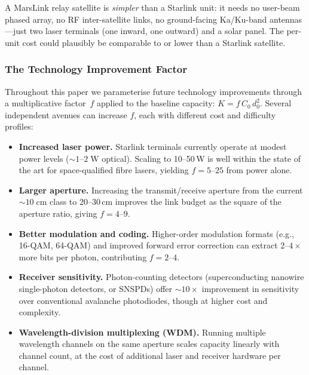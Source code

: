 A MarsLink relay satellite is \emph{simpler} than a Starlink unit: it needs no
user-beam phased array, no RF inter-satellite links, no ground-facing Ka/Ku-band
antennas---just two laser terminals (one inward, one outward) and a solar panel.
The per-unit cost could plausibly be comparable to or lower than a Starlink
satellite.

\subsubsection{The Technology Improvement Factor}

Throughout this paper we parameterise future technology improvements through a
multiplicative factor~$f$ applied to the baseline capacity:
$K = f \, C_0 \, d_0^2$. Several independent avenues can increase $f$, each with
different cost and difficulty profiles:

\begin{itemize}
  \item \textbf{Increased laser power.} Starlink terminals currently operate at
    modest power levels ($\sim\!1$--$2\;\text{W}$ optical). Scaling to
    10--50\,W is well within the state of the art for space-qualified fibre
    lasers, yielding $f = 5$--$25$ from power alone.
  \item \textbf{Larger aperture.} Increasing the transmit/receive aperture from
    the current $\sim\!10\;\text{cm}$ class to 20--30\,cm improves the link budget
    as the square of the aperture ratio, giving $f = 4$--$9$.
  \item \textbf{Better modulation and coding.} Higher-order modulation formats
    (e.g., 16-QAM, 64-QAM) and improved forward error correction can extract
    2--$4\times$ more bits per photon, contributing $f = 2$--$4$.
  \item \textbf{Receiver sensitivity.} Photon-counting detectors
    (superconducting nanowire single-photon detectors, or SNSPDs) offer
    $\sim\!10\times$ improvement in sensitivity over conventional avalanche
    photodiodes, though at higher cost and complexity.
  \item \textbf{Wavelength-division multiplexing (WDM).} Running multiple
    wavelength channels on the same aperture scales capacity linearly with
    channel count, at the cost of additional laser and receiver hardware per
    channel.
\end{itemize}

